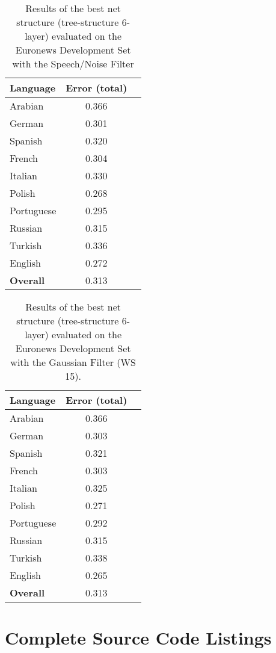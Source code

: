 \begin{table}[!htbp]
\centering
\caption{Results of the best net structure (tree-structure 6-layer) evaluated on the Euronews Development Set with the Speech/Noise Filter}
\label{tab:speech}
\begin{tabular}{| l | c | r | }
	\hline
	\textbf{Language} & \textbf{Error (total) }  \\
	\hline
	Arabian & 0.366  \\
	German & 0.301  \\
	Spanish & 0.320 \\ 
	French & 0.304 \\
	Italian & 0.330  \\
	Polish & 0.268 \\
	Portuguese& 0.295 \\
	Russian&  0.315 \\
	Turkish&  0.336 \\
	English&  0.272 \\
	\hline
	\textbf{Overall} & 0.313 \\
	\hline
\end{tabular}
\end{table}

\begin{table}[!htbp]
\centering
\caption{Results of the best net structure (tree-structure 6-layer) evaluated on the Euronews Development Set with the Gaussian Filter (WS 15).}
\label{tab:gauss}
\begin{tabular}{| l | c | r | }
	\hline
	\textbf{Language} & \textbf{Error (total) }  \\
	\hline
	Arabian & 0.366  \\
	German & 0.303  \\
	Spanish & 0.321 \\ 
	French & 0.303 \\
	Italian & 0.325  \\
	Polish & 0.271 \\
	Portuguese& 0.292 \\
	Russian&  0.315 \\
	Turkish&  0.338 \\
	English&  0.265 \\
	\hline
	\textbf{Overall} & 0.313 \\
	\hline
\end{tabular}
\end{table}

\FloatBarrier
\section{Complete Source Code Listings}

